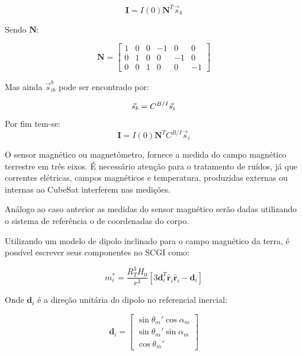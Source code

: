 \begin{equation}
\mathbf{I}=I(0)\mathbf{N}^T\vec{s}_b
\end{equation}

Sendo $\mathbf{N}$:

\begin{equation}
\mathbf{N}=\begin{bmatrix}
1 & 0 & 0 & -1 & 0 & 0\\ 
0 & 1 & 0 & 0 & -1 & 0\\ 
0 & 0 & 1 & 0 & 0 & -1
\end{bmatrix}\end{equation}

Mas ainda $\vec{s}^b_{ib}$ pode ser encontrado por:

\begin{equation}
\vec{s}_b=C^{B/I}\vec{s}_i\\
\end{equation}
Por fim tem-se:
\begin{equation}
\mathbf{I}=I(0)\mathbf{N}^T C^{B/I}\vec{s}_i
\end{equation}

O sensor magnético ou magnetômetro, fornece a medida do campo magnético terrestre em três eixos. É necessário atenção para o tratamento de ruídos, já que correntes elétricas, campos magnéticos e temperatura, produzidas externas ou internas ao CubeSat interferem nas medições.

Análogo ao caso anterior as medidas do sensor magnético serão dadas utilizando o sistema de referência o de coordenadas do corpo. 

Utilizando um modelo de dipolo inclinado para o campo magnético da terra, é possível escrever seus componentes no SCGI como:

\begin{equation}
m_i^* = \frac{R_T^3H_0}{r^3}\left [ 3\mathbf{d}_i^T\mathbf{\hat{r}}_i\mathbf{\hat{r}}_i-\mathbf{d}_i \right ]
\end{equation}

Onde $\mathbf{d}_i$ é a direção unitária do dipolo no referencial inercial:

\begin{equation}
\mathbf{d}_i=\begin{bmatrix} \sin\theta_m'\cos\alpha_m \\\sin\theta_m'\sin\alpha_m \\ \cos\theta_m'\end{bmatrix}
\end{equation}

